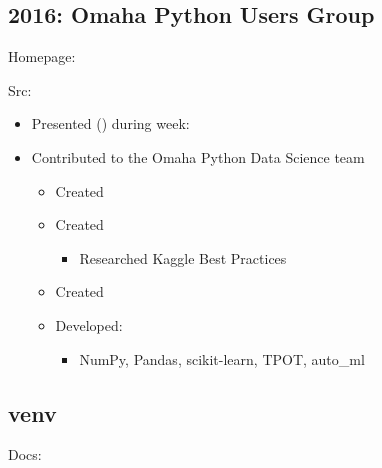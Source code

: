 \documentclass[letter,,openany,oneside,english]{sphinxhowto}
\begin{document}
\subsection{2016: Omaha Python Users Group}
\label{\detokenize{resume:omaha-python-users-group}}
\begin{DUlineblock}{0em}
\item[] Homepage: 
\item[] Src: 
\end{DUlineblock}
\begin{itemize}
\item {} 
Presented {\hyperref[\detokenize{resume:pyglobalgoals}]{}} () during  week:

\item {} 
Contributed to the Omaha Python Data Science team
\begin{itemize}
\item {} 
Created 

\item {} 
Created 
\begin{itemize}
\item {} 
Researched \sphinxquotedblleft{}Kaggle Best Practices\sphinxquotedblright{}

\end{itemize}

\item {} 
Created 

\item {} 
Developed: 
\begin{itemize}
\item {} 
NumPy, Pandas, scikit-learn, TPOT, auto\_ml

\end{itemize}

\end{itemize}

\end{itemize}


\subsection{venv}
\label{\detokenize{resume:venv}}
\begin{DUlineblock}{0em}
\item[] Docs: 
\end{DUlineblock}
\end{document}
